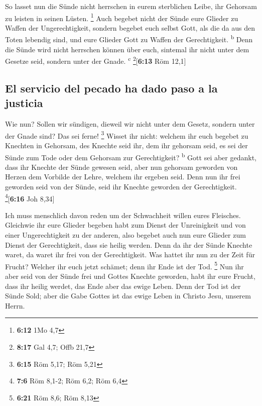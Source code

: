  So lasset nun die Sünde nicht herrschen in eurem
sterblichen Leibe, ihr Gehorsam zu leisten in seinen Lüsten. \footnote{\textbf{6:12}
  1Mo 4,7}  Auch begebet nicht der Sünde eure Glieder zu
Waffen der Ungerechtigkeit, sondern begebet euch selbst Gott, als die da
aus den Toten lebendig sind, und eure Glieder Gott zu Waffen der
Gerechtigkeit. \textsuperscript{b}  Denn die Sünde wird
nicht herrschen können über euch, sintemal ihr nicht unter dem Gesetze
seid, sondern unter der Gnade. \textsuperscript{c}
\footnote{\textbf{8:17} Gal 4,7; Offb 21,7}{[}\textbf{6:13} Röm 12,1{]}

\hypertarget{el-servicio-del-pecado-ha-dado-paso-a-la-justicia}{%
\subsection{El servicio del pecado ha dado paso a la
justicia}\label{el-servicio-del-pecado-ha-dado-paso-a-la-justicia}}

 Wie nun? Sollen wir sündigen, dieweil wir nicht unter
dem Gesetz, sondern unter der Gnade sind? Das sei ferne! \footnote{\textbf{6:15}
  Röm 5,17; Röm 5,21}  Wisset ihr nicht: welchem ihr euch
begebet zu Knechten in Gehorsam, des Knechte seid ihr, dem ihr gehorsam
seid, es sei der Sünde zum Tode oder dem Gehorsam zur Gerechtigkeit?
\textsuperscript{b}  Gott sei aber gedankt, dass ihr
Knechte der Sünde gewesen seid, aber nun gehorsam geworden von Herzen
dem Vorbilde der Lehre, welchem ihr ergeben seid.  Denn
nun ihr frei geworden seid von der Sünde, seid ihr Knechte geworden der
Gerechtigkeit. \footnote{\textbf{7:6} Röm 8,1-2; Röm 6,2; Röm 6,4}{[}\textbf{6:16}
Joh 8,34{]}

 Ich muss menschlich davon reden um der Schwachheit
willen eures Fleisches. Gleichwie ihr eure Glieder begeben habt zum
Dienst der Unreinigkeit und von einer Ungerechtigkeit zu der anderen,
also begebet auch nun eure Glieder zum Dienst der Gerechtigkeit, dass
sie heilig werden.  Denn da ihr der Sünde Knechte waret,
da waret ihr frei von der Gerechtigkeit.  Was hattet ihr
nun zu der Zeit für Frucht? Welcher ihr euch jetzt schämet; denn ihr
Ende ist der Tod. \footnote{\textbf{6:21} Röm 8,6; Röm 8,13}
 Nun ihr aber seid von der Sünde frei und Gottes Knechte
geworden, habt ihr eure Frucht, dass ihr heilig werdet, das Ende aber
das ewige Leben.  Denn der Tod ist der Sünde Sold; aber
die Gabe Gottes ist das ewige Leben in Christo Jesu, unserem Herrn.

